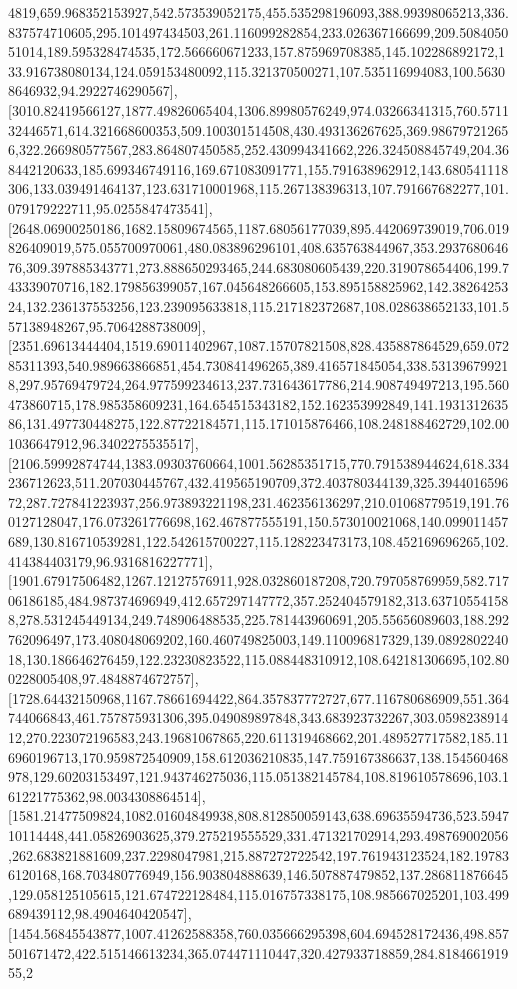 \documentclass{article}
\begin{document}
4819,659.968352153927,542.573539052175,455.535298196093,388.99398065213,336.837574710605,295.101497434503,261.116099282854,233.026367166699,209.508405051014,189.595328474535,172.566660671233,157.875969708385,145.102286892172,133.916738080134,124.059153480092,115.321370500271,107.535116994083,100.56308646932,94.2922746290567],[3010.82419566127,1877.49826065404,1306.89980576249,974.03266341315,760.571132446571,614.321668600353,509.100301514508,430.493136267625,369.986797212656,322.266980577567,283.864807450585,252.430994341662,226.324508845749,204.368442120633,185.699346749116,169.671083091771,155.791638962912,143.680541118306,133.039491464137,123.631710001968,115.267138396313,107.791667682277,101.079179222711,95.0255847473541],[2648.06900250186,1682.15809674565,1187.68056177039,895.442069739019,706.019826409019,575.055700970061,480.083896296101,408.635763844967,353.293768064676,309.397885343771,273.888650293465,244.683080605439,220.319078654406,199.743339070716,182.179856399057,167.045648266605,153.895158825962,142.3826425324,132.236137553256,123.239095633818,115.217182372687,108.028638652133,101.557138948267,95.7064288738009],[2351.69613444404,1519.69011402967,1087.15707821508,828.435887864529,659.07285311393,540.989663866851,454.730841496265,389.416571845054,338.531396799218,297.95769479724,264.977599234613,237.731643617786,214.908749497213,195.560473860715,178.985358609231,164.654515343182,152.162353992849,141.193131263586,131.497730448275,122.87722184571,115.171015876466,108.248188462729,102.001036647912,96.3402275535517],[2106.59992874744,1383.09303760664,1001.56285351715,770.791538944624,618.334236712623,511.207030445767,432.419565190709,372.403780344139,325.394401659672,287.727841223937,256.973893221198,231.462356136297,210.01068779519,191.760127128047,176.073261776698,162.467877555191,150.573010021068,140.099011457689,130.816710539281,122.542615700227,115.128223473173,108.452169696265,102.414384403179,96.9316816227771],[1901.67917506482,1267.12127576911,928.032860187208,720.797058769959,582.71706186185,484.987374696949,412.657297147772,357.252404579182,313.637105541588,278.531245449134,249.748906488535,225.781443960691,205.55656089603,188.292762096497,173.408048069202,160.460749825003,149.110096817329,139.089280224018,130.186646276459,122.23230823522,115.088448310912,108.642181306695,102.800228005408,97.4848874672757],[1728.64432150968,1167.78661694422,864.357837772727,677.116780686909,551.364744066843,461.757875931306,395.049089897848,343.683923732267,303.059823891412,270.223072196583,243.19681067865,220.611319468662,201.489527717582,185.116960196713,170.959872540909,158.612036210835,147.759167386637,138.154560468978,129.60203153497,121.943746275036,115.051382145784,108.819610578696,103.161221775362,98.0034308864514],[1581.21477509824,1082.01604849938,808.812850059143,638.69635594736,523.594710114448,441.05826903625,379.275219555529,331.471321702914,293.498769002056,262.683821881609,237.2298047981,215.887272722542,197.761943123524,182.197836120168,168.703480776949,156.903804888639,146.507887479852,137.286811876645,129.058125105615,121.674722128484,115.016757338175,108.985667025201,103.499689439112,98.4904640420547],[1454.56845543877,1007.41262588358,760.035666295398,604.694528172436,498.857501671472,422.515146613234,365.074471110447,320.427933718859,284.818466191955,2
\end{document}

